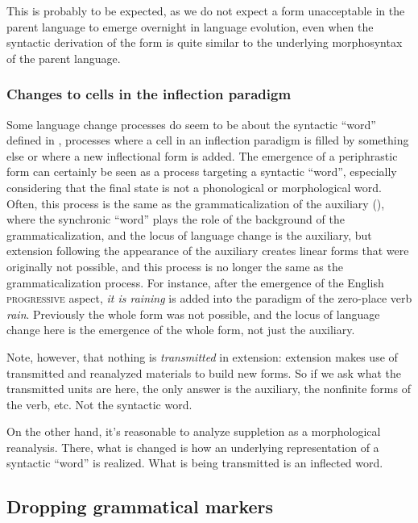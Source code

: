 \documentclass[a4paper, oneside, scheme=plain, 12pt]{article}
\newcommand{\form}[1]{\emph{#1}}
\newcommand*{\category}[1]{\textsc{#1}}
\begin{document}
This is probably to be expected, as we do not expect a form unacceptable in the parent language to emerge overnight in language evolution,
even when the syntactic derivation of the form is quite similar to the underlying morphosyntax of the parent language.


\subsubsection{Changes to cells in the inflection paradigm}\label{sec:new-inflection-cell}

Some language change processes do seem to be about the syntactic ``word'' defined in ,
processes where a cell in an inflection paradigm is filled by something else
or where a new inflectional form is added.
The emergence of a periphrastic form can certainly be seen as 
a process targeting a syntactic ``word'',
especially considering that the final state is not a phonological or morphological word.
Often, this process is the same as the grammaticalization of the auxiliary
(),
where the synchronic ``word'' plays the role of the background of the grammaticalization,
and the locus of language change is the auxiliary,
but extension following the appearance of the auxiliary creates linear forms
that were originally not possible,
and this process is no longer the same as the grammaticalization process.
For instance, after the emergence of the English \category{progressive} aspect,
\form{it is raining} is added into the paradigm of the zero-place verb \form{rain}.
Previously the whole form was not possible,
and the locus of language change here is the emergence of the whole form,
not just the auxiliary.

Note, however, that nothing is \emph{transmitted} in extension:
extension makes use of transmitted and reanalyzed materials to build new forms.
So if we ask what the transmitted units are here,
the only answer is the auxiliary, the nonfinite forms of the verb, etc.
Not the syntactic word.

On the other hand, it's reasonable to analyze suppletion as a morphological reanalysis.
There, what is changed is how an underlying representation of a syntactic ``word'' is realized.
What is being transmitted is an inflected word.

\subsection{Dropping grammatical markers}
\end{document}
